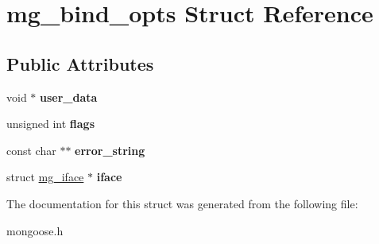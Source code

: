 \hypertarget{structmg__bind__opts}{}\section{mg\+\_\+bind\+\_\+opts Struct Reference}
\label{structmg__bind__opts}
\subsection*{Public Attributes}
\begin{DoxyCompactItemize}
\item 
\mbox{\label{structmg__bind__opts_a3bd493ef5bd6c8da605b1480a6c189c4}} 
void $\ast$ {\bfseries user\+\_\+data}
\item 
\mbox{\label{structmg__bind__opts_ae257fe726a23692a36fb8c92885d4873}} 
unsigned int {\bfseries flags}
\item 
\mbox{\label{structmg__bind__opts_a9320251e7b1a273fedc123a3739fb9fa}} 
const char $\ast$$\ast$ {\bfseries error\+\_\+string}
\item 
\mbox{\label{structmg__bind__opts_a328924ea266e19c9add95902d82271ad}} 
struct \hyperlink{structmg__iface}{mg\+\_\+iface} $\ast$ {\bfseries iface}
\end{DoxyCompactItemize}


The documentation for this struct was generated from the following file\+:\begin{DoxyCompactItemize}
\item 
mongoose.\+h\end{DoxyCompactItemize}
